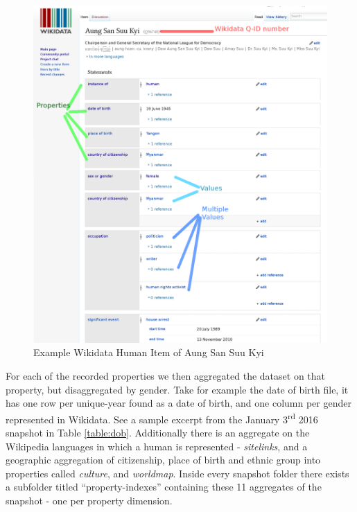 \documentclass[letterpaper]{article}
\begin{document}
\begin{figure}
\includegraphics[scale=0.15]{figures/aung_explainer.png} 
\caption{Example Wikidata Human Item of Aung San Suu Kyi}
\label{fig:aung}
\end{figure}
 
For each of the recorded properties we then aggregated the dataset on that property, but disaggregated by gender. Take for example the date of birth file, it has one row per unique-year found as a date of birth, and one column per gender represented in Wikidata. See a sample excerpt from the January 3\textsuperscript{rd} 2016 snapshot in Table \ref{table:dob}. Additionally there is an aggregate on the Wikipedia languages in which a human is represented - \textit{sitelinks}, and a geographic aggregation of citizenship, place of birth and ethnic group into properties called \textit{culture}, and \textit{worldmap}. Inside every snapshot folder there exists a subfolder titled ``property-indexes'' containing these 11 aggregates of the snapshot - one per property dimension.
 
\end{document}
